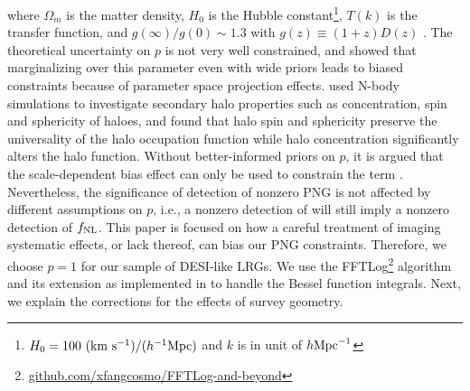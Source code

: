 where $\Omega_{m}$ is the matter density, $H_{0}$ is the Hubble constant\footnote{$H_{0}=100~({\rm km}~{\rm s}^{-1})/(h^{-1}{\rm Mpc})$ and $k$ is in unit of $h {\rm Mpc}^{-1}$}, $T(k)$ is the transfer function, and $g(\infty)/g(0) \sim 1.3$ with $g(z)\equiv (1+z) D(z)$ .  The theoretical uncertainty on $p$ is not very well constrained, and \cite{2022JCAP...11..013B} showed that marginalizing over this parameter even with wide priors leads to biased constraints because of parameter space projection effects. \cite{2023JCAP...01..023L} used N-body simulations to investigate secondary halo properties such as concentration, spin and sphericity of haloes, and found that halo spin and sphericity preserve the universality of the halo occupation function while halo concentration significantly alters the halo function. Without better-informed priors on $p$, it is argued that the scale-dependent bias effect can only  be used to constrain the  term \citep[see, e.g.,][]{2020JCAP...12..013B, 2020JCAP...12..031B}. Nevertheless, the significance of detection of nonzero PNG is not affected by different assumptions on $p$, i.e., a nonzero detection of  will still imply a nonzero detection of $f_{\rm NL}$. This paper is focused on how a careful treatment of imaging systematic effects, or lack thereof, can bias our PNG constraints. Therefore, we choose $p=1$ for our sample of DESI-like LRGs. We use the FFTLog\footnote{\href{https://github.com/xfangcosmo/FFTLog-and-beyond}{github.com/xfangcosmo/FFTLog-and-beyond}} algorithm and its extension as implemented in \cite{fang2020beyond} to handle the Bessel function integrals. Next, we explain the corrections for the effects of survey geometry.


